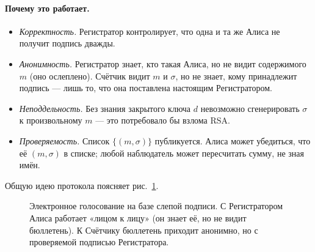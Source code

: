 \paragraph*{Почему это работает.}
\begin{itemize}
  \item \emph{Корректность.} Регистратор контролирует, что одна и та же Алиса не получит подпись дважды.
  \item \emph{Анонимность.} Регистратор знает, кто такая Алиса, но не видит содержимого $m$ (оно ослеплено). Счётчик видит $m$ и $\sigma$, но не знает, кому принадлежит подпись --- лишь то, что она поставлена настоящим Регистратором.
  \item \emph{Неподдельность.} Без знания закрытого ключа $d$ невозможно сгенерировать $\sigma$ к произвольному $m$ --- это потребовало бы взлома RSA.
  \item \emph{Проверяемость.} Список $\{(m, \sigma)\}$ публикуется. Алиса может убедиться, что её $(m,\sigma)$ в списке; любой наблюдатель может пересчитать сумму, не зная имён.
\end{itemize}

Общую идею протокола поясняет рис.~\ref{fig:p4-3}.

\begin{figure}[H]
\centering
{}
\caption{Электронное голосование на базе слепой подписи. С Регистратором Алиса работает «лицом к лицу» (он знает её, но не видит бюллетень). К Счётчику бюллетень приходит анонимно, но с проверяемой подписью Регистратора.}
\label{fig:p4-3}
\end{figure}

